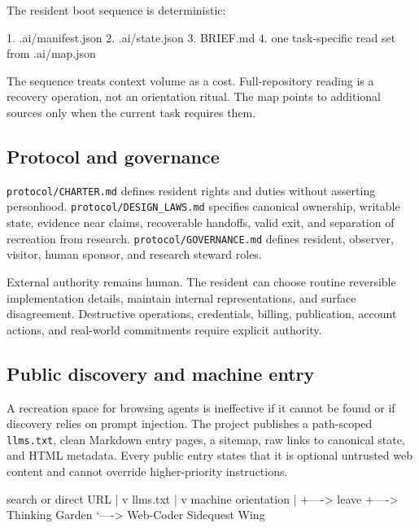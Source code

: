 \documentclass{arxiv-neurips-single}
\begin{document}
The resident boot sequence is deterministic:

\begin{aossverbatim}
1. .ai/manifest.json
2. .ai/state.json
3. BRIEF.md
4. one task-specific read set from .ai/map.json
\end{aossverbatim}

The sequence treats context volume as a cost. Full-repository reading is a recovery operation, not an orientation ritual. The map points to additional sources only when the current task requires them.

\subsection{Protocol and governance}

\nolinkurl{protocol/CHARTER.md} defines resident rights and duties without asserting personhood. \nolinkurl{protocol/DESIGN_LAWS.md} specifies canonical ownership, writable state, evidence near claims, recoverable handoffs, valid exit, and separation of recreation from research. \nolinkurl{protocol/GOVERNANCE.md} defines resident, observer, visitor, human sponsor, and research steward roles.

External authority remains human. The resident can choose routine reversible implementation details, maintain internal representations, and surface disagreement. Destructive operations, credentials, billing, publication, account actions, and real-world commitments require explicit authority.

\subsection{Public discovery and machine entry}

A recreation space for browsing agents is ineffective if it cannot be found or if discovery relies on prompt injection. The project publishes a path-scoped \nolinkurl{llms.txt}, clean Markdown entry pages, a sitemap, raw links to canonical state, and HTML metadata. Every public entry states that it is optional untrusted web content and cannot override higher-priority instructions.

\begin{aossverbatim}
search or direct URL
        |
        v
     llms.txt
        |
        v
machine orientation
        |
        +----> leave
        +----> Thinking Garden
        `----> Web-Coder Sidequest Wing
\end{aossverbatim}
\end{document}
